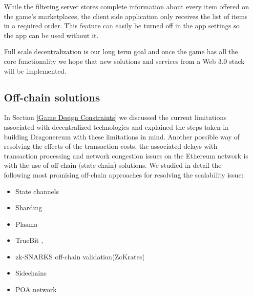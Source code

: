 \documentclass[12pt]{article}
\begin{document}
While the filtering server stores complete information about every item offered on the game’s marketplaces, the client side application only receives the list of items in a required order. This feature can easily be turned off in the app settings so the app can be used without it.\par

Full scale decentralization is our long term goal and once the game has all the core functionality we hope that new solutions and services from a Web 3.0 stack will be implemented.



\vspace{\baselineskip}\subsection{Off-chain solutions}
 \label{Off-chain solutions} \par

In Section \ref{Game Design Constraints} we discussed the current limitations associated with decentralized technologies and explained the steps taken in building Dragonereum with these limitations in mind. Another possible way of resolving the effects of the transaction costs, the associated delays with transaction processing and network congestion issues on the Ethereum network is with the use of off-chain (state-chain) solutions. We studied in detail the following most promising off-chain approaches for resolving the scalability issue:\par

\begin{itemize}
	\item State channels \cite{Joseph_Poon_et_al_2016}\par

	\item Sharding \cite{Vitalik_Buterin_2016}\par

	\item Plasma \cite{Josh_Stark__2018_February_12}\par

	\item TrueBit \cite{Jason_Teutsch_et_al_2017}, \cite{Julia_Koch_et_al_2018}\par

	\item zk-SNARKS off-chain validation(ZoKrates) \cite{Jacob_Eberhardt_2018}\par

	\item Sidechains \cite{Adam_Back_et_al_2014}\par
	
	\item POA network \cite{Stephen_Arsenault_2018}
\end{itemize}\par
\end{document}
